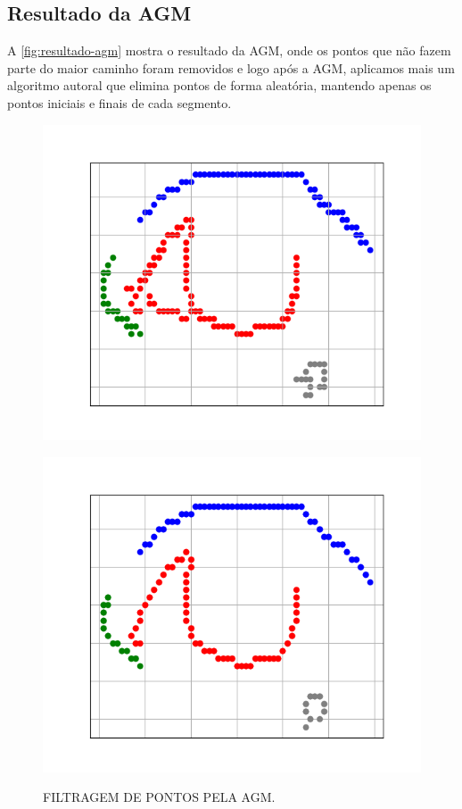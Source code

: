 \subsection{Resultado da AGM}
\label{sec:resultado-agm}

A \autoref{fig:resultado-agm} mostra o resultado da AGM, onde os pontos que não fazem parte do maior caminho foram removidos e logo após a AGM, aplicamos mais um algoritmo autoral que elimina pontos de forma aleatória, mantendo apenas os pontos iniciais e finais de cada segmento.

\begin{figure}[h!]
    \caption{FILTRAGEM DE PONTOS PELA AGM.}
    \centering
    \begin{minipage}[b]{0.45\textwidth}
        \centering
        \includegraphics[width=0.9\linewidth]{fig/04_connected_components_right_eye.png}
        \label{fig:olho-grafo}
    \end{minipage}
    \hfill
    \begin{minipage}[b]{0.45\textwidth}
        \centering
        \includegraphics[width=0.9\linewidth]{fig/05_longest_path_right_eye.png}
        \label{fig:olho-agm}
    \end{minipage}


\end{figure}
